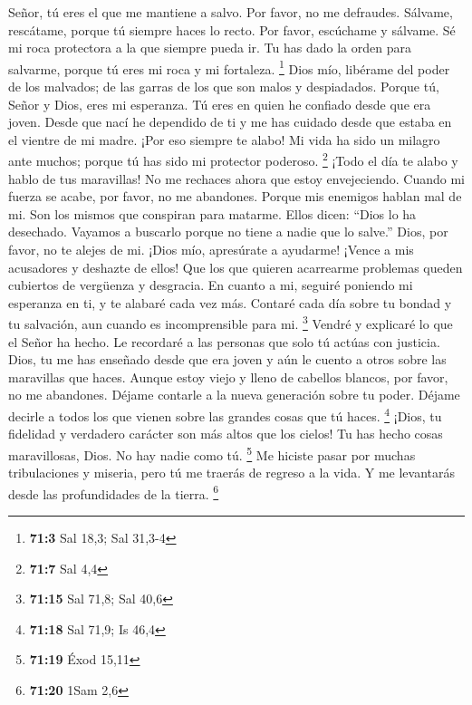  Señor, tú eres el que me mantiene a salvo. Por favor, no me
defraudes.  Sálvame, rescátame, porque tú siempre haces lo
recto.  Por favor, escúchame y sálvame. Sé mi roca
protectora a la que siempre pueda ir. Tu has dado la orden para
salvarme, porque tú eres mi roca y mi fortaleza. \footnote{\textbf{71:3}
  Sal 18,3; Sal 31,3-4}  Dios mío, libérame del poder de los
malvados; de las garras de los que son malos y despiadados. 
Porque tú, Señor y Dios, eres mi esperanza. Tú eres en quien he confiado
desde que era joven.  Desde que nací he dependido de ti y me
has cuidado desde que estaba en el vientre de mi madre. ¡Por eso siempre
te alabo!  Mi vida ha sido un milagro ante muchos; porque tú
has sido mi protector poderoso. \footnote{\textbf{71:7} Sal 4,4}
 ¡Todo el día te alabo y hablo de tus maravillas!
 No me rechaces ahora que estoy envejeciendo. Cuando mi
fuerza se acabe, por favor, no me abandones.  Porque mis
enemigos hablan mal de mi. Son los mismos que conspiran para matarme.
 Ellos dicen: ``Dios lo ha desechado. Vayamos a buscarlo
porque no tiene a nadie que lo salve.''  Dios, por favor,
no te alejes de mi. ¡Dios mío, apresúrate a ayudarme! 
¡Vence a mis acusadores y deshazte de ellos! Que los que quieren
acarrearme problemas queden cubiertos de vergüenza y desgracia.
 En cuanto a mi, seguiré poniendo mi esperanza en ti, y te
alabaré cada vez más.  Contaré cada día sobre tu bondad y
tu salvación, aun cuando es incomprensible para mi. \footnote{\textbf{71:15}
  Sal 71,8; Sal 40,6}  Vendré y explicaré lo que el Señor
ha hecho. Le recordaré a las personas que solo tú actúas con justicia.
 Dios, tu me has enseñado desde que era joven y aún le
cuento a otros sobre las maravillas que haces.  Aunque
estoy viejo y lleno de cabellos blancos, por favor, no me abandones.
Déjame contarle a la nueva generación sobre tu poder. Déjame decirle a
todos los que vienen sobre las grandes cosas que tú haces. \footnote{\textbf{71:18}
  Sal 71,9; Is 46,4}  ¡Dios, tu fidelidad y verdadero
carácter son más altos que los cielos! Tu has hecho cosas maravillosas,
Dios. No hay nadie como tú. \footnote{\textbf{71:19} Éxod 15,11}
 Me hiciste pasar por muchas tribulaciones y miseria, pero
tú me traerás de regreso a la vida. Y me levantarás desde las
profundidades de la tierra. \footnote{\textbf{71:20} 1Sam 2,6}

